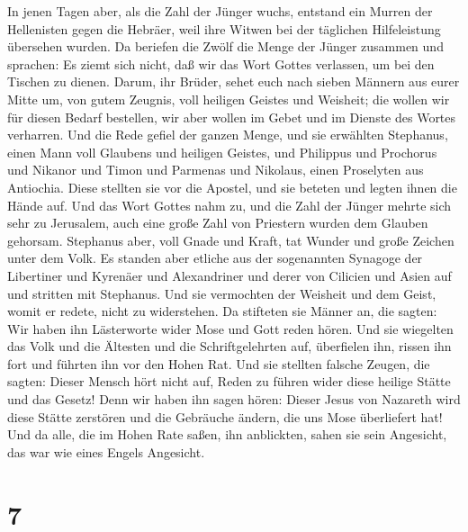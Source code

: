  In jenen Tagen aber, als die Zahl der Jünger wuchs,
entstand ein Murren der Hellenisten gegen die Hebräer, weil ihre Witwen
bei der täglichen Hilfeleistung übersehen wurden.  Da
beriefen die Zwölf die Menge der Jünger zusammen und sprachen: Es ziemt
sich nicht, daß wir das Wort Gottes verlassen, um bei den Tischen zu
dienen.  Darum, ihr Brüder, sehet euch nach sieben Männern
aus eurer Mitte um, von gutem Zeugnis, voll heiligen Geistes und
Weisheit; die wollen wir für diesen Bedarf bestellen,  wir
aber wollen im Gebet und im Dienste des Wortes verharren. 
Und die Rede gefiel der ganzen Menge, und sie erwählten Stephanus, einen
Mann voll Glaubens und heiligen Geistes, und Philippus und Prochorus und
Nikanor und Timon und Parmenas und Nikolaus, einen Proselyten aus
Antiochia.  Diese stellten sie vor die Apostel, und sie
beteten und legten ihnen die Hände auf.  Und das Wort
Gottes nahm zu, und die Zahl der Jünger mehrte sich sehr zu Jerusalem,
auch eine große Zahl von Priestern wurden dem Glauben gehorsam.
 Stephanus aber, voll Gnade und Kraft, tat Wunder und
große Zeichen unter dem Volk.  Es standen aber etliche aus
der sogenannten Synagoge der Libertiner und Kyrenäer und Alexandriner
und derer von Cilicien und Asien auf und stritten mit Stephanus.
 Und sie vermochten der Weisheit und dem Geist, womit er
redete, nicht zu widerstehen.  Da stifteten sie Männer
an, die sagten: Wir haben ihn Lästerworte wider Mose und Gott reden
hören.  Und sie wiegelten das Volk und die Ältesten und
die Schriftgelehrten auf, überfielen ihn, rissen ihn fort und führten
ihn vor den Hohen Rat.  Und sie stellten falsche Zeugen,
die sagten: Dieser Mensch hört nicht auf, Reden zu führen wider diese
heilige Stätte und das Gesetz!  Denn wir haben ihn sagen
hören: Dieser Jesus von Nazareth wird diese Stätte zerstören und die
Gebräuche ändern, die uns Mose überliefert hat!  Und da
alle, die im Hohen Rate saßen, ihn anblickten, sahen sie sein Angesicht,
das war wie eines Engels Angesicht.

\hypertarget{section-6}{%
\section{7}\label{section-6}}

